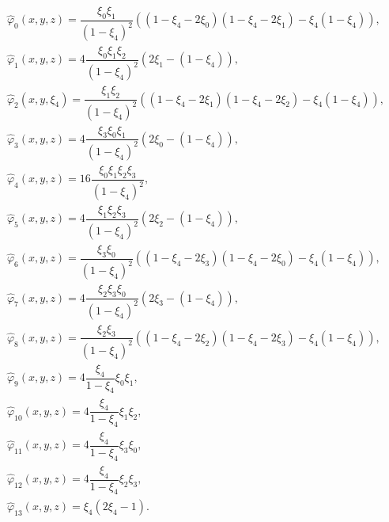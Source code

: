 \documentclass[a4paper,11pt,english]{sphinxmanual}
\begin{document}
\begin{equation*}
\begin{split}\begin{array}{l}
\widehat{\varphi}_{0}(x,y,z) = \dfrac{\xi_0 \xi_1}{(1-\xi_4)^2}((1-\xi_4-2\xi_0)(1-\xi_4-2\xi_1) -\xi_4(1-\xi_4)), \\
\widehat{\varphi}_{1}(x,y,z) = 4\dfrac{\xi_0\xi_1\xi_2}{(1-\xi_4)^2}(2\xi_1-(1-\xi_4)), \\
\widehat{\varphi}_{2}(x,y,\xi_4) = \dfrac{\xi_1 \xi_2}{(1-\xi_4)^2}((1-\xi_4-2\xi_1)(1-\xi_4-2\xi_2) -\xi_4(1-\xi_4)), \\
\widehat{\varphi}_{3}(x,y,z) = 4\dfrac{\xi_3\xi_0\xi_1}{(1-\xi_4)^2}(2\xi_0-(1-\xi_4)), \\
\widehat{\varphi}_{4}(x,y,z) = 16\dfrac{\xi_0\xi_1\xi_2\xi_3}{(1-\xi_4)^2}, \\
\widehat{\varphi}_{5}(x,y,z) = 4\dfrac{\xi_1\xi_2\xi_3}{(1-\xi_4)^2}(2\xi_2-(1-\xi_4)), \\
\widehat{\varphi}_{6}(x,y,z) = \dfrac{\xi_3 \xi_0}{(1-\xi_4)^2}((1-\xi_4-2\xi_3)(1-\xi_4-2\xi_0) -\xi_4(1-\xi_4)), \\
\widehat{\varphi}_{7}(x,y,z) = 4\dfrac{\xi_2\xi_3\xi_0}{(1-\xi_4)^2}(2\xi_3-(1-\xi_4)), \\
\widehat{\varphi}_{8}(x,y,z) = \dfrac{\xi_2 \xi_3}{(1-\xi_4)^2}((1-\xi_4-2\xi_2)(1-\xi_4-2\xi_3) -\xi_4(1-\xi_4)), \\
\widehat{\varphi}_{9}(x,y,z) = 4\dfrac{\xi_4}{1-\xi_4}\xi_0\xi_1, \\
\widehat{\varphi}_{10}(x,y,z) = 4\dfrac{\xi_4}{1-\xi_4}\xi_1\xi_2,  \\
\widehat{\varphi}_{11}(x,y,z) = 4\dfrac{\xi_4}{1-\xi_4}\xi_3\xi_0,  \\
\widehat{\varphi}_{12}(x,y,z) = 4\dfrac{\xi_4}{1-\xi_4}\xi_2\xi_3,  \\
\widehat{\varphi}_{13}(x,y,z) = \xi_4(2\xi_4-1). \\
\end{array}\end{split}
\end{equation*}
\end{document}
